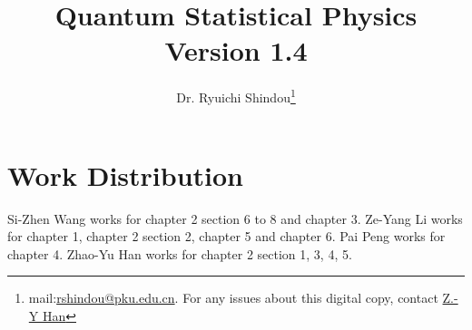 \documentclass[twoside]{book}
\numberwithin{equation}{section}
\begin{document}
\title{Quantum Statistical Physics\\\normalsize Version 1.4}
\author{Dr. Ryuichi Shindou\footnote{mail:\href{mailto:rshindou@pku.edu.cn}{rshindou@pku.edu.cn}. For any issues about this digital copy, contact \href{mailto:heinsius@pku.edu.cn}{Z.-Y Han}}}
\maketitle


\tableofcontents











\newpage

\chapter*{Work Distribution}
Si-Zhen Wang works for chapter 2 section 6 to 8 and chapter 3. Ze-Yang Li works for chapter 1, chapter 2 section 2, chapter 5 and chapter 6. Pai Peng works for chapter 4. Zhao-Yu Han works for chapter 2 section 1, 3, 4, 5. 
\end{document}
